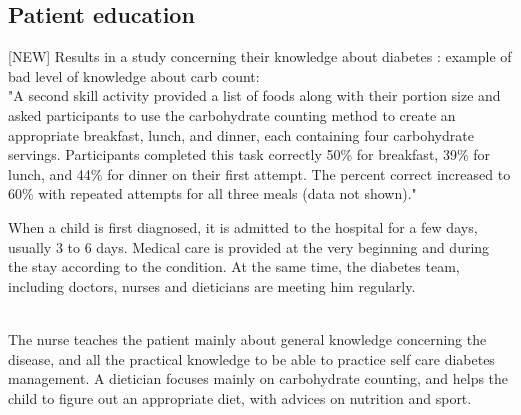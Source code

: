 



\subsection{Patient education}

[NEW] Results in a study concerning their knowledge about diabetes : example of bad level of knowledge about carb count:
\\"A second skill activity provided a list of foods along with their portion size and asked participants to use the carbohydrate counting method to create an appropriate breakfast, lunch, and dinner, each containing four carbohydrate servings. Participants completed this task correctly 50\% for breakfast, 39\% for lunch, and 44\% for dinner on their first attempt. The percent correct increased to 60\% with repeated attempts for all three meals (data not shown)."~\cite{herrejon2009creation}


When a child is first diagnosed, it is admitted to the hospital for a few days, usually 3 to 6 days. Medical care is provided at the very beginning and during the stay according to the condition. At the same time, the diabetes team, including doctors, nurses and dieticians are meeting him regularly. 

\\
The nurse teaches the patient mainly about general knowledge concerning the disease, and all the practical knowledge to be able to practice self care diabetes management. A dietician focuses mainly on carbohydrate counting, and helps the child to figure out an appropriate diet, with advices on nutrition and sport.
\iffalse


